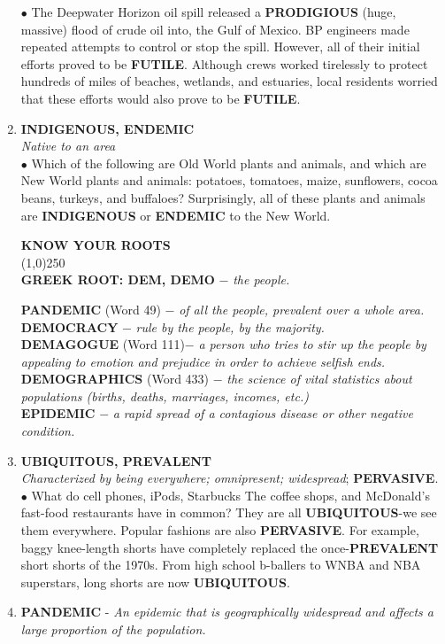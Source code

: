 \documentclass{book}
\begin{document}
\begin{enumerate}
$\bullet$ The Deepwater Horizon oil spill released a \textbf{PRODIGIOUS} (huge, massive) flood of crude oil into, the Gulf of Mexico. BP engineers made repeated attempts to control or stop the spill. However, all of their initial efforts proved to be \textbf{FUTILE}. Although crews worked tirelessly to protect hundreds of miles of beaches, wetlands, and estuaries, local residents worried that these efforts would also prove to be \textbf{FUTILE}.
\item \textbf{INDIGENOUS, ENDEMIC}\\ \textit{Native to an area}\\ 

$\bullet$ Which of the following are Old World plants and animals, and which are New World plants and animals: potatoes, tomatoes, maize, sunflowers, cocoa beans, turkeys, and buffaloes? Surprisingly, all of these plants and animals are \textbf{INDIGENOUS} or \textbf{ENDEMIC} to the New World.
\begin{tcolorbox}
\begin{center}
\textbf{ KNOW YOUR ROOTS}\\
\line(1,0){250}\\
\textbf{GREEK ROOT: DEM, DEMO} $ - $ \textit{ the people.}
\end{center}  
  \textbf{PANDEMIC} (Word 49) $ - $  \textit{of all the people, prevalent over a whole area.}\\ 
\textbf{DEMOCRACY} $ - $ \textit{rule by the people, by the majority.}\\ 
\textbf{DEMAGOGUE} (Word 111)$ - $ \textit{a person who tries to stir up the people by appealing to emotion and prejudice in order to achieve selfish ends.}\\
 \textbf{DEMOGRAPHICS} (Word 433) $ - $ \textit{the science of vital statistics about populations (births, deaths, marriages, incomes, etc.)}\\ 
\textbf{EPIDEMIC} $ - $ \textit{a rapid spread of a contagious disease or other negative condition.}
\end{tcolorbox}
\item \textbf{UBIQUITOUS, PREVALENT}\\ \textit{Characterized by being everywhere; omnipresent; widespread}; \textbf{PERVASIVE}.\\ 

$\bullet$ What do cell phones, iPods, Starbucks The coffee shops, and McDonald's fast-food restaurants have in common? They are all \textbf{UBIQUITOUS}-we see them everywhere. Popular fashions are also \textbf{PERVASIVE}. For example, baggy knee-length shorts have completely replaced the once-\textbf{PREVALENT} short shorts of the 1970s. From high school b-ballers to WNBA and NBA superstars, long shorts are now \textbf{UBIQUITOUS}.
\item \textbf{PANDEMIC} -  \textit{An epidemic that is geographically widespread and affects a large proportion of the population.}\\ 


\end{enumerate}
\end{document}
